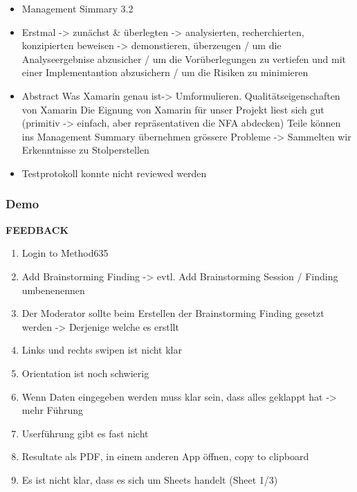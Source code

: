 \begin{itemize}
\item Management Simmary 3.2 
\item Erstmal -\textgreater{} zunächst \& überlegten -\textgreater{}
analysierten, recherchierten, konzipierten beweisen -\textgreater{}
demonstieren, überzeugen / um die Analyseergebnise abzusicher / um die
Vorüberlegungen zu vertiefen und mit einer Implementantion abzusichern /
um die Risiken zu minimieren


\item
  Abstract Was Xamarin genau ist-\textgreater{} Umformulieren.
  Qualitätseigenschaften von Xamarin Die Eignung von Xamarin für unser
  Projekt liest sich gut (primitiv -\textgreater{} einfach, aber
  repräsentativen die NFA abdecken) Teile können ins Management Summary
  übernehmen grössere Probleme -\textgreater{} Sammelten wir
  Erkenntnisse zu Stolperstellen
\item
  Testprotokoll konnte nicht reviewed werden
\end{itemize}

\hypertarget{demo}{%
\subsubsection*{Demo}\label{demo}}

\textbf{FEEDBACK}

\begin{enumerate}
\def\labelenumi{\arabic{enumi}.}

\item
  Login to Method635
\item
  Add Brainstorming Finding -\textgreater{} evtl. Add Brainstorming
  Session / Finding umbenenennen
\item
  Der Moderator sollte beim Erstellen der Brainstorming Finding gesetzt
  werden -\textgreater{} Derjenige welche es erstllt
\item
  Links und rechts swipen ist nicht klar
\item
  Orientation ist noch schwierig
\item
  Wenn Daten eingegeben werden muss klar sein, dass alles geklappt hat
  -\textgreater{} mehr Führung
\item
  Userführung gibt es fast nicht
\item
  Resultate als PDF, in einem anderen App öffnen, copy to clipboard
\item
  Es ist nicht klar, dass es sich um Sheets handelt (Sheet 1/3)
\end{enumerate}


